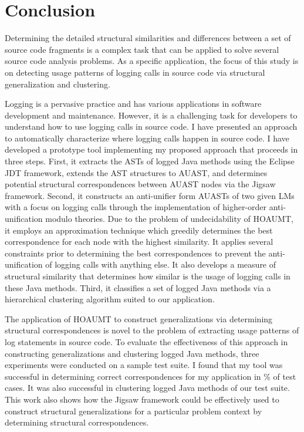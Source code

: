 
\chapter{Conclusion}  \label{conc}
Determining the detailed structural similarities and differences between a set of source code fragments is a complex task that can be applied to solve several source code analysis problems. As a specific application, the focus of this study is on detecting usage patterns of logging calls in source code via structural generalization and clustering.

Logging is a pervasive practice and has various applications in software development and maintenance. However, it is a challenging task for developers to understand how to use logging calls in source code. I have presented an approach to automatically characterize where logging calls happen in source code.
I have developed a prototype tool implementing my proposed approach that proceeds in three steps. First, it extracts the ASTs of logged Java methods using the Eclipse JDT framework, extends the AST structures to AUAST, and determines potential structural correspondences between AUAST nodes via the Jigsaw framework. Second, it constructs an anti-unifier form AUASTs of two given LMs with a focus on logging calls through the implementation of higher-order anti-unification modulo theories. Due to the problem of undecidability of HOAUMT, it employs an approximation technique which greedily determines the best correspondence for each node with the highest similarity. It applies several constraints prior to determining the best correspondences to prevent the anti-unification of logging calls with anything else. It also develops a measure of structural similarity that determines how similar is the usage of logging calls in these Java methods. Third, it classifies a set of logged Java methods via a hierarchical clustering algorithm suited to our application.


The application of HOAUMT to construct generalizations via determining structural correspondences is novel to the problem of extracting usage patterns of log statements in source code. To evaluate the effectiveness of this approach in constructing generalizations and clustering logged Java methods, three experiments were conducted on a sample test suite. I found that my tool was successful in determining correct correspondences for my application in \% of test cases. It was also successful in clustering logged Java methods of our test suite. This work also shows how the Jigsaw framework could be effectively used to construct structural generalizations for a particular problem context by determining structural correspondences.

